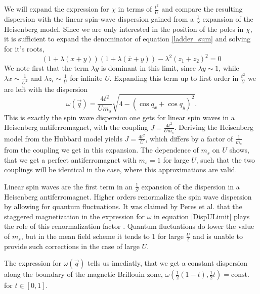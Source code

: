 %
%

We will expand the expression for $\chi$ in terms of $\frac{t^2}{U}$ 
and compare the resulting dispersion with the linear spin-wave dispersion gained from a $\frac1S$ expansion of the Heisenberg model.
Since we are only interested in the position of the poles in $\chi$, it is sufficient to expand the denominator of equation \ref{ladder_sum} and solving for it's roots,
\begin{equation}
 \left(1+\lambda(x+y)\right)\left(1+\lambda(\bar x + y)\right) - \lambda^2(z_1 +z_2)^2 = 0
\end{equation}
We note first that the term $\lambda y$ is dominant in this limit, since $\lambda y \sim 1$, while $\lambda x \sim \frac1{U^2}$ and $\lambda z_i \sim \frac1U$
for infinite $U$.
Expanding this term
up to first order in  $\frac{t^2}U$ we are left with the dispersion
\begin{equation}\label{DispULimit}
 \omega(\vec q) = \frac{4t^2}{Um_s}\sqrt{4-(\cos q_x+\cos q_y)^2}. 
\end{equation}
This is exactly the spin wave dispersion one gets for linear spin waves in a Heisenberg antiferromagnet, 
with the coupling $J=\frac{4t^2}{Um_s}$.
Deriving the Heisenberg model from the Hubbard model yields $J=\frac{4t^2}{U}$, which differs by a factor of $\frac1{m_s}$ from the coupling we get in this expansion.
The dependence of $m_s$ on $U$ shows, that we get a perfect antiferromagnet with $m_s=1$ for large $U$, 
such that the two couplings will be identical in the case, where this approximations are valid. 
%

Linear spin waves are the first term in an $\frac1S$ expansion of the dispersion in a Heisenberg antiferromagnet.
Higher orders renormalize the spin wave dispersion by allowing for quantum fluctuations.
It was claimed by Peres et al. that the staggered magnetization in the expression for $\omega$ in equation \ref{DispULimit} 
plays the role of this renormalization factor \cite{PhysRevB.65.132404}.
Quantum fluctuations do lower the value of $m_s$, but in the mean field scheme it tends to 1 for large $\frac Ut$ 
and is unable to provide such corrections in the case of large $U$.

The expression for $\omega(\vec q)$ tells us imediatly, that we get a constant dispersion along the 
boundary of the magnetic Brillouin zone, $\omega(\frac12(1-t), \frac12t) =\mathrm{const.}$ for $t \in [0,1]$.


